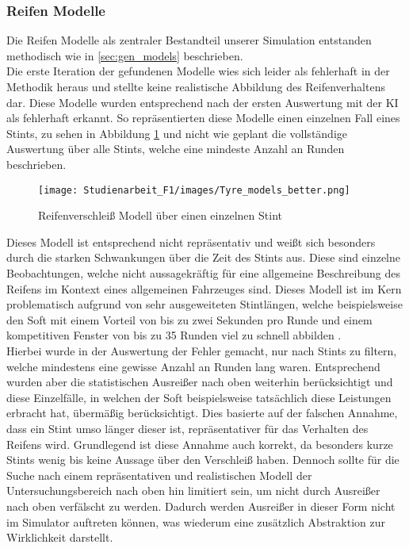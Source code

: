 \subsubsection{Reifen Modelle}
Die Reifen Modelle als zentraler Bestandteil unserer Simulation entstanden methodisch wie in \ref{sec:gen_models} beschrieben.\\
Die erste Iteration der gefundenen Modelle wies sich leider als fehlerhaft in der Methodik heraus und stellte keine realistische Abbildung des Reifenverhaltens dar. Diese Modelle wurden entsprechend nach der ersten Auswertung mit der KI als fehlerhaft erkannt. So repräsentierten diese Modelle einen einzelnen Fall eines Stints, zu sehen in Abbildung \ref{fig:tyre_model_single_stint} und nicht wie geplant die vollständige Auswertung über alle Stints, welche eine mindeste Anzahl an Runden beschrieben.
\begin{figure}[H]
    \centering
    \texttt{[image: Studienarbeit\_F1/images/Tyre\_models\_better.png]}
    \caption{Reifenverschleiß Modell über einen einzelnen Stint}
    \label{fig:tyre_model_single_stint}
\end{figure}
Dieses Modell ist entsprechend nicht repräsentativ und weißt sich besonders durch die starken Schwankungen über die Zeit des Stints aus. Diese sind einzelne Beobachtungen, welche nicht aussagekräftig für eine allgemeine Beschreibung des Reifens im Kontext eines allgemeinen Fahrzeuges sind. Dieses Modell ist im Kern problematisch aufgrund von sehr ausgeweiteten Stintlängen, welche beispielsweise den Soft mit einem Vorteil von bis zu zwei Sekunden pro Runde und einem kompetitiven Fenster von bis zu 35 Runden viel zu schnell abbilden .\\
Hierbei wurde in der Auswertung der Fehler gemacht, nur nach Stints zu filtern, welche mindestens eine gewisse Anzahl an Runden lang waren. Entsprechend wurden aber die statistischen Ausreißer nach oben weiterhin berücksichtigt und diese Einzelfälle, in welchen der Soft beispielsweise tatsächlich diese Leistungen erbracht hat, übermäßig berücksichtigt. Dies basierte auf der falschen Annahme, dass ein Stint umso länger dieser ist, repräsentativer für das Verhalten des Reifens wird. Grundlegend ist diese Annahme auch korrekt, da besonders kurze Stints wenig bis keine Aussage über den Verschleiß haben. Dennoch sollte für die Suche nach einem repräsentativen und realistischen Modell der Untersuchungsbereich nach oben hin limitiert sein, um nicht durch Ausreißer nach oben verfälscht zu werden. Dadurch werden Ausreißer in dieser Form nicht im Simulator auftreten können, was wiederum eine zusätzlich Abstraktion zur Wirklichkeit darstellt.
